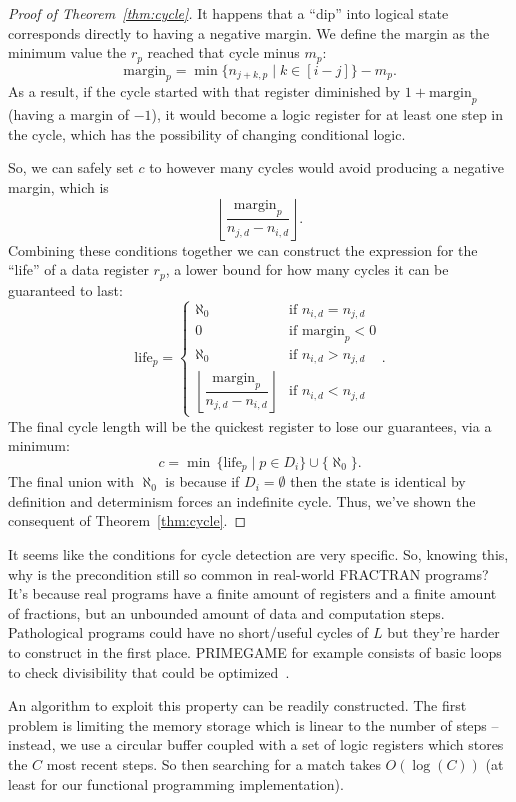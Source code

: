 \documentclass[12pt]{article}
\begin{document}
\begin{proof}[Proof of Theorem~\ref{thm:cycle}]
It happens that a ``dip'' into logical state corresponds directly to having a negative margin. We define the margin as the minimum value the $r_p$ reached that cycle minus $m_p$:
\[
\mathrm{margin}_p = \min\{n_{j+k,p} \mid k \in [i-j]\} - m_p.
\]
As a result, if the cycle started with that register diminished by $1 + \mathrm{margin}_p$ (having a margin of $-1$), it would become a logic register for at least one step in the cycle, which has the possibility of changing conditional logic.

So, we can safely set $c$ to however many cycles would avoid producing a negative margin, which is
\[
\left\lfloor \frac{\mathrm{margin}_p}{n_{j,d} - n_{i,d}} \right\rfloor.
\]
Combining these conditions together we can construct the expression for the ``life'' of a data register $r_p$, a lower bound for how many cycles it can be guaranteed to last:
\[
\mathrm{life}_p =
\begin{cases}
\aleph_0 & \text{if } n_{i,d} = n_{j,d} \\
0 & \text{if } \mathrm{margin}_p < 0 \\
\aleph_0 & \text{if } n_{i,d} > n_{j,d} \\
\left\lfloor \dfrac{\mathrm{margin}_p}{n_{j,d} - n_{i,d}} \right\rfloor & \text{if } n_{i,d} < n_{j,d}
\end{cases}.
\]
The final cycle length will be the quickest register to lose our guarantees, via a minimum:
\[
c = \min\,\{\mathrm{life}_p \mid p \in D_i\} \cup \{\aleph_0\}.
\]
The final union with $\aleph_0$ is because if $D_i = \emptyset$ then the state is identical by definition and determinism forces an indefinite cycle. Thus, we've shown the consequent of Theorem~\ref{thm:cycle}.
\end{proof}

It seems like the conditions for cycle detection are very specific. So, knowing this, why is the precondition still so common in real-world FRACTRAN programs? It's because real programs have a finite amount of registers and a finite amount of fractions, but an unbounded amount of data and computation steps. Pathological programs could have no short/useful cycles of $L$ but they're harder to construct in the first place. PRIMEGAME for example consists of basic loops to check divisibility that could be optimized~\cite{guy1983}.

An algorithm to exploit this property can be readily constructed. The first problem is limiting the memory storage which is linear to the number of steps -- instead, we use a circular buffer coupled with a set of logic registers which stores the $C$ most recent steps. So then searching for a match takes $O(\log(C))$ (at least for our functional programming implementation).
\end{document}
